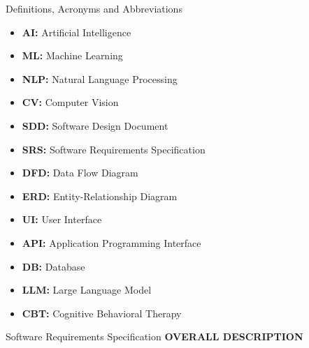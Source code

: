 \documentclass{beamer}
\begin{document}
\begin{frame}{Definitions, Acronyms and Abbreviations}
    \justifying
    \begin{itemize}
        \item \textbf{AI:} Artificial Intelligence
        \item \textbf{ML:} Machine Learning
        \item \textbf{NLP:} Natural Language Processing
        \item \textbf{CV:} Computer Vision
        \item \textbf{SDD:} Software Design Document
        \item \textbf{SRS:} Software Requirements Specification
        \item \textbf{DFD:} Data Flow Diagram
        \item \textbf{ERD:} Entity-Relationship Diagram
        \item \textbf{UI:} User Interface
        \item \textbf{API:} Application Programming Interface
        \item \textbf{DB:} Database
        \item \textbf{LLM:} Large Language Model
        \item \textbf{CBT:} Cognitive Behavioral Therapy
    \end{itemize}
\end{frame}

\begin{frame}{Software Requirements Specification}
    \justifying
    \centering
    \huge \textbf{OVERALL DESCRIPTION}
\end{frame}
\end{document}
